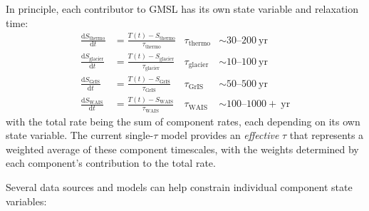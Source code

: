 \documentclass[11pt]{article}
\begin{document}
In principle, each contributor to GMSL has its own state variable and relaxation time:
\begin{align}
  \frac{\mathrm{d}S_{\text{thermo}}}{\mathrm{d}t} &= \frac{T(t) - S_{\text{thermo}}}{\tau_{\text{thermo}}}
  & \tau_{\text{thermo}} &\sim 30\text{--}200~\text{yr} \label{eq:S_thermo} \\
  \frac{\mathrm{d}S_{\text{glacier}}}{\mathrm{d}t} &= \frac{T(t) - S_{\text{glacier}}}{\tau_{\text{glacier}}}
  & \tau_{\text{glacier}} &\sim 10\text{--}100~\text{yr} \label{eq:S_glacier} \\
  \frac{\mathrm{d}S_{\text{GrIS}}}{\mathrm{d}t} &= \frac{T(t) - S_{\text{GrIS}}}{\tau_{\text{GrIS}}}
  & \tau_{\text{GrIS}} &\sim 50\text{--}500~\text{yr} \label{eq:S_GrIS} \\
  \frac{\mathrm{d}S_{\text{WAIS}}}{\mathrm{d}t} &= \frac{T(t) - S_{\text{WAIS}}}{\tau_{\text{WAIS}}}
  & \tau_{\text{WAIS}} &\sim 100\text{--}1000+~\text{yr} \label{eq:S_WAIS}
\end{align}
with the total rate being the sum of component rates, each depending on its own state variable.  The current single-$\tau$ model provides an \emph{effective} $\tau$ that represents a weighted average of these component timescales, with the weights determined by each component's contribution to the total rate.

Several data sources and models can help constrain individual component state variables:
\end{document}
